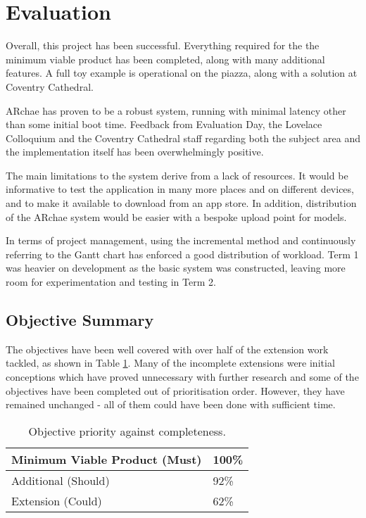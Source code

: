 \documentclass[12pt, a4paper]{article}
\begin{document}
\newpage
\section{Evaluation}
\label{Evaluation}
Overall, this project has been successful. Everything required for the the minimum viable product has been completed, along with many additional features. A full toy example is operational on the piazza, along with a solution at Coventry Cathedral. 

ARchae has proven to be a robust system, running with minimal latency other than some initial boot time. Feedback from Evaluation Day, the Lovelace Colloquium and the Coventry Cathedral staff regarding both the subject area and the implementation itself has been overwhelmingly positive.

The main limitations to the system derive from a lack of resources. It would be informative to test the application in many more places and on different devices, and to make it available to download from an app store. In addition, distribution of the ARchae system would be easier with a bespoke upload point for models.

In terms of project management, using the incremental method and continuously referring to the Gantt chart has enforced a good distribution of workload. Term 1 was heavier on development as the basic system was constructed, leaving more room for experimentation and testing in Term 2.

\subsection{Objective Summary}
The objectives have been well covered with over half of the extension work tackled, as shown in Table \ref{table:objectivesummary}. Many of the incomplete extensions were initial conceptions which have proved unnecessary with further research and some of the objectives have been completed out of prioritisation order. However, they have remained unchanged - all of them could have been done with sufficient time.  

\begin{table}[H]
\centering
\begin{tabular}{|l|l|}
\hline
Minimum Viable Product (Must)          & 100\% \\ \hline
Additional (Should) & 92\%  \\ \hline
Extension (Could)   & 62\%  \\ \hline
\end{tabular}
\caption{Objective priority against completeness.}
\label{table:objectivesummary}
\end{table}
\end{document}
